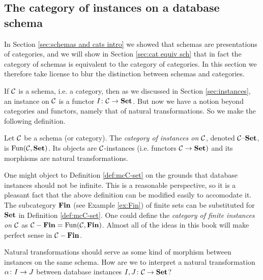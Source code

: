 
\subsection{The category of instances on a database schema}

In Section \ref{sec:schemas and cats intro} we showed that schemas are presentations of categories, and we will show in Section \ref{sec:cat equiv sch} that in fact the category of schemas is equivalent to the category of categories. In this section we therefore take license to blur the distinction between schemas and categories.

If $\mathcal{C}$ is a schema, i.e. a category, then as we discussed in Section \ref{sec:instances}, an instance on $\mathcal{C}$ is a functor $I\colon\mathcal{C}\rightarrow{\bf Set}$. But now we have a notion beyond categories and functors, namely that of natural transformations. So we make the following definition.

\begin{definition}\label{def:mcC-set}

Let $\mathcal{C}$ be a schema (or category). The {\em category of instances on $\mathcal{C}$}, denoted $\mathcal{C}{\text \textendash}{\bf Set}$, is $\textnormal{Fun}(\mathcal{C},{\bf Set})$. Its objects are $\mathcal{C}$-instances (i.e. functors $\mathcal{C}\rightarrow{\bf Set})$ and its morphisms are natural transformations.

\end{definition}

\begin{remark}

One might object to Definition \ref{def:mcC-set} on the grounds that database instances should not be infinite. This is a reasonable perspective, so it is a pleasant fact that the above definition can be modified easily to accomodate it. The subcategory ${\bf Fin}$ (see Example \ref{ex:Fin}) of finite sets can be substituted for ${\bf Set}$ in Definition \ref{def:mcC-set}. One could define the {\em category of finite instances on $\mathcal{C}$} as $\mathcal{C}-{\bf Fin}=\textnormal{Fun}(\mathcal{C},{\bf Fin})$. Almost all of the ideas in this book will make perfect sense in $\mathcal{C}-{\bf Fin}$.

\end{remark}

Natural transformations should serve as some kind of morphism between instances on the same schema. How are we to interpret a natural transformation $\alpha\colon I\rightarrow J$ between database instances $I,J\colon\mathcal{C}\rightarrow{\bf Set}$? 

